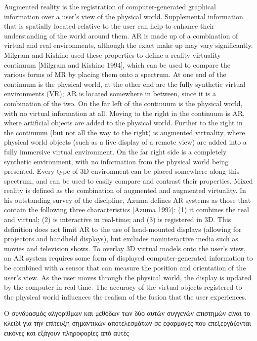 Augmented reality is the registration of computer-generated graphical information over a user’s view of the physical world. Supplemental information that is spatially located relative to the user can help to enhance their understanding of the world around them. AR is made up of a combination of virtual and real environments, although the exact make up may vary significantly. Milgram and Kishino used these properties to define a reality-virtuality continuum [Milgram and Kishino 1994], which can be used to compare the various forms of MR by placing them onto a spectrum. At one end of the continuum is the physical world, at the other end are the fully synthetic virtual environments (VR); AR is located somewhere in between, since it is a combination of the two. On the far left of the continuum is the physical world, with no virtual information at all. Moving to the right in the continuum is AR, where artificial objects are added to the physical world. Further to the right in the continuum (but not all the way to the right) is augmented virtuality, where physical world objects (such as a live display of a remote view) are added into a fully immersive virtual environment. On the far right side is a completely synthetic environment, with no information from the physical world being presented. Every type of 3D environment can be placed somewhere along this spectrum, and can be used to easily compare and contrast their properties. Mixed reality is defined as the combination of augmented and augmented virtuality. In his outstanding survey of the discipline, Azuma defines AR systems as those that contain the following three characteristics [Azuma 1997]: (1) it combines the real and virtual; (2) is interactive in real-time; and (3) is registered in 3D. This definition does not limit AR to the use of head-mounted displays (allowing for projectors and handheld displays), but excludes noninteractive media such as movies and television shows. To overlay 3D virtual models onto the user’s view, an AR system requires some form of displayed computer-generated information to be combined with a sensor that can measure the position and orientation of the user’s view. As the user moves through the physical world, the display is updated by the computer in real-time. The accuracy of the virtual objects registered to the physical world influences the realism of the fusion that the user experiences.


Ο συνδυασμός αλγορίθμων και μεθόδων των δύο
αυτών συγγενών επιστημών είναι το κλειδί για την επίτευξη σημαντικών αποτελεσμάτων σε εφαρμογές που επεξεργάζονται εικόνες και εξάγουν πληροφορίες από αυτές


